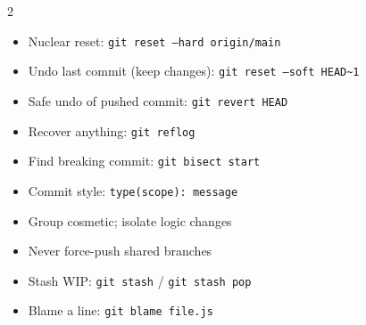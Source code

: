 \documentclass[11pt, letterpaper]{article}
\begin{document}
\begin{tcolorbox}[colback=part7bg, colframe=sectiongrey,
  title={\bfseries Git Emergency Commands}, arc=3pt, boxrule=1pt]
\footnotesize
\begin{multicols}{2}
\begin{itemize}[noitemsep, leftmargin=*]
  \item Nuclear reset: \texttt{git reset --hard origin/main}
  \item Undo last commit (keep changes): \texttt{git reset --soft HEAD\textasciitilde1}
  \item Safe undo of pushed commit: \texttt{git revert HEAD}
  \item Recover anything: \texttt{git reflog}
  \item Find breaking commit: \texttt{git bisect start}
\end{itemize}
\columnbreak
\begin{itemize}[noitemsep, leftmargin=*]
  \item Commit style: \texttt{type(scope): message}
  \item Group cosmetic; isolate logic changes
  \item Never force-push shared branches
  \item Stash WIP: \texttt{git stash} / \texttt{git stash pop}
  \item Blame a line: \texttt{git blame file.js}
\end{itemize}
\end{multicols}
\end{tcolorbox}

\vspace{4pt}
\end{document}
